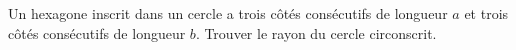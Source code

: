 Un hexagone inscrit dans un cercle a trois côtés consécutifs de longueur $a$ et trois côtés consécutifs de longueur $b$. Trouver le rayon du cercle circonscrit.
